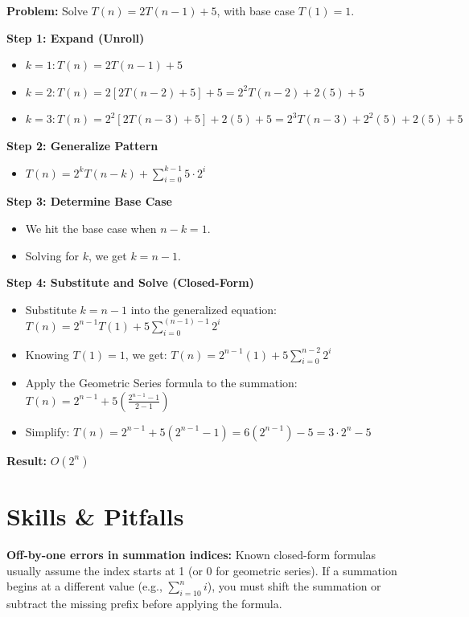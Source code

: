 \begin{example}[Solving $T(n) = 2T(n-1) + 5$]
\textbf{Problem:} Solve $T(n) = 2T(n-1) + 5$, with base case $T(1) = 1$.

\textbf{Step 1: Expand (Unroll)}
\begin{itemize}
    \item $k=1: T(n) = 2T(n-1) + 5$
    \item $k=2: T(n) = 2[2T(n-2) + 5] + 5 = 2^2T(n-2) + 2(5) + 5$
    \item $k=3: T(n) = 2^2[2T(n-3) + 5] + 2(5) + 5 = 2^3T(n-3) + 2^2(5) + 2(5) + 5$
\end{itemize}

\textbf{Step 2: Generalize Pattern}
\begin{itemize}
    \item $T(n) = 2^k T(n-k) + \sum_{i=0}^{k-1} 5 \cdot 2^i$
\end{itemize}

\textbf{Step 3: Determine Base Case}
\begin{itemize}
    \item We hit the base case when $n - k = 1$.
    \item Solving for $k$, we get $k = n - 1$.
\end{itemize}

\textbf{Step 4: Substitute and Solve (Closed-Form)}
\begin{itemize}
    \item Substitute $k = n - 1$ into the generalized equation:
    $T(n) = 2^{n-1}T(1) + 5 \sum_{i=0}^{(n-1)-1} 2^i$
    \item Knowing $T(1) = 1$, we get:
    $T(n) = 2^{n-1}(1) + 5 \sum_{i=0}^{n-2} 2^i$
    \item Apply the Geometric Series formula to the summation:
    $T(n) = 2^{n-1} + 5 \left( \frac{2^{n-1} - 1}{2 - 1} \right)$
    \item Simplify:
    $T(n) = 2^{n-1} + 5(2^{n-1} - 1) = 6(2^{n-1}) - 5 = 3 \cdot 2^n - 5$
\end{itemize}
\textbf{Result:} $O(2^n)$
\end{example}

\section{Skills \& Pitfalls}

\begin{remark}
\textbf{Off-by-one errors in summation indices:} Known closed-form formulas usually assume the index starts at 1 (or 0 for geometric series). If a summation begins at a different value (e.g., $\sum_{i=10}^n i$), you must shift the summation or subtract the missing prefix before applying the formula.
\end{remark}

